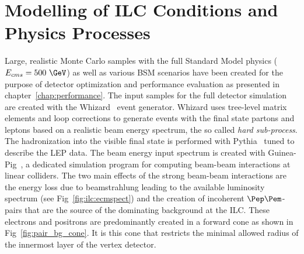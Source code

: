 \section{\label{sec:generator} Modelling of ILC Conditions and Physics Processes}
%
%
Large, realistic Monte Carlo samples with the full Standard Model physics ($E_{cms}=500~\GeV$) as well as various
BSM scenarios have been created for the purpose of detector optimization and performance evaluation as
presented in chapter~\ref{chap:performance}. The input samples for the full detector simulation
are created with the Whizard~\cite{Kilian:2007gr} event generator.
Whizard uses tree-level matrix elements and loop corrections to generate events with the final state partons and leptons
based on a realistic beam energy spectrum, the so called \emph{hard sub-process}. The hadronization into the visible final state
is performed with Pythia~\cite{Sjostrand:2006za} tuned to describe the LEP data.
The beam energy input spectrum is created with Guinea-Pig~\cite{Schulte:1998au}, a dedicated simulation program for computing
beam-beam interactions at linear colliders. The two main effects of the strong beam-beam interactions are the energy loss due to
beamstrahlung leading to the available luminosity spectrum (see Fig~\ref{fig:ilc:ecmspect}) and the creation of
incoherent $\Pep\Pem$-pairs that are the source of the dominating background at the ILC.
These electrons and positrons are predominantly created in a forward cone as shown in Fig~\ref{fig:pair_bg_cone}.
It is this cone that restricts the minimal allowed radius of the innermost layer of the vertex detector.
%
